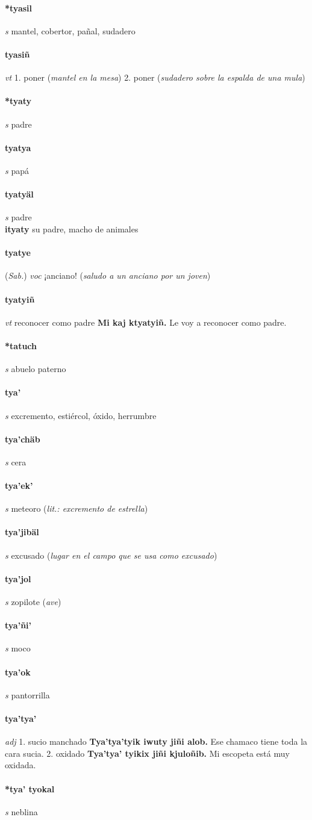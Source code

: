 \documentclass{scrbook}
\newcommand{\entry}[1]{\paragraph{#1}}
\newcommand{\onedefinition}[1]{#1.}
\newcommand{\partofspeech}[1]{\textit{#1}}
\newcommand{\spanishtranslation}[1]{#1}
\newcommand{\clarification}[1]{(\textit{#1})}
\newcommand{\cholexample}[1]{\textbf{#1}}
\newcommand{\exampletranslation}[1]{#1}
\newcommand{\relevantdialect}[1]{(\textit{#1})}
\newcommand{\secondaryentry}[1]{\\\textbf{#1}}
\newcommand{\secondtranslation}[1]{#1}
\begin{document}
\begin{multicols}{2}
\entry{*tyasil}
\partofspeech{s}
\spanishtranslation{mantel, cobertor, pañal, sudadero}

\entry{tyasiñ}
\partofspeech{vt}
\onedefinition{1}
\spanishtranslation{poner}
\clarification{mantel en la mesa}
\onedefinition{2}
\spanishtranslation{poner}
\clarification{sudadero sobre la espalda de una mula}

\entry{*tyaty}
\partofspeech{s}
\spanishtranslation{padre}

\entry{tyatya}
\partofspeech{s}
\spanishtranslation{papá}

\entry{tyatyäl}
\partofspeech{s}
\spanishtranslation{padre}
\secondaryentry{ityaty}
\secondtranslation{su padre, macho de animales}

\entry{tyatye}
\relevantdialect{Sab.}
\partofspeech{voc}
\spanishtranslation{¡anciano!}
\clarification{saludo a un anciano por un joven}

\entry{tyatyiñ}
\partofspeech{vt}
\spanishtranslation{reconocer como padre}
\cholexample{Mi kaj ktyatyiñ.}
\exampletranslation{Le voy a reconocer como padre.}

\entry{*tatuch}
\partofspeech{s}
\spanishtranslation{abuelo paterno}

\entry{tya'}
\partofspeech{s}
\spanishtranslation{excremento, estiércol, óxido, herrumbre}

\entry{tya'chäb}
\partofspeech{s}
\spanishtranslation{cera}

\entry{tya'ek'}
\partofspeech{s}
\spanishtranslation{meteoro}
\clarification{lit.: excremento de estrella}

\entry{tya'jibäl}
\partofspeech{s}
\spanishtranslation{excusado}
\clarification{lugar en el campo que se usa como excusado}

\entry{tya'jol}
\partofspeech{s}
\spanishtranslation{zopilote}
\clarification{ave}

\entry{tya'ñi'}
\partofspeech{s}
\spanishtranslation{moco}

\entry{tya'ok}
\partofspeech{s}
\spanishtranslation{pantorrilla}

\entry{tya'tya'}
\partofspeech{adj}
\onedefinition{1}
\spanishtranslation{sucio}
\spanishtranslation{manchado}
\cholexample{Tya'tya'tyik iwuty jiñi alob.}
\exampletranslation{Ese chamaco tiene toda la cara sucia.}
\onedefinition{2}
\spanishtranslation{oxidado}
\cholexample{Tya'tya' tyikix jiñi kjuloñib.}
\exampletranslation{Mi escopeta está muy oxidada.}

\entry{*tya' tyokal}
\partofspeech{s}
\spanishtranslation{neblina}


\end{multicols}
\end{document}
